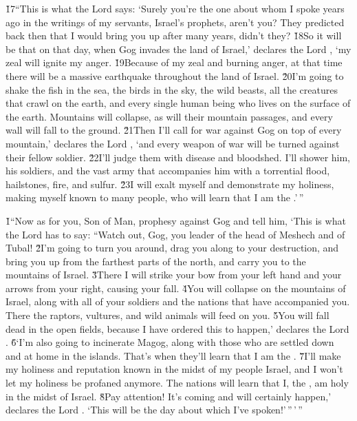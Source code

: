 \v{17}``This is what the Lord  says: `Surely you're the one about whom I spoke years ago in the writings of my servants, Israel's prophets, aren't you? They predicted back then that I would bring you up after many years, didn't they? \v{18}So it will be that on that day, when Gog invades the land of Israel,' declares the Lord , `my zeal will ignite my anger. \v{19}Because of my zeal and burning anger, at that time there will be a massive earthquake throughout the land of Israel. \v{20}I'm going to shake the fish in the sea, the birds in the sky, the wild beasts, all the creatures that crawl on the earth, and every single human being who lives on the surface of the earth. Mountains will collapse, as will their mountain passages, and every wall will fall to the ground. \v{21}Then I'll call for war against Gog on top of every mountain,' declares the Lord , `and every weapon of war will be turned against their fellow soldier. \v{22}I'll judge them with disease and bloodshed. I'll shower him, his soldiers, and the vast army that accompanies him with a torrential flood, hailstones, fire, and sulfur. \v{23}I will exalt myself and demonstrate my holiness, making myself known to many people, who will learn that I am the .'\,''

\v{1}``Now as for you, Son of Man, prophesy against Gog and tell him, `This is what the Lord  has to say: ``Watch out, Gog, you leader of the head of Meshech and of Tubal! \v{2}I'm going to turn you around, drag you along to your destruction, and bring you up from the farthest parts of the north, and carry you to the mountains of Israel. \v{3}There I will strike your bow from your left hand and your arrows from your right, causing your fall. \v{4}You will collapse on the mountains of Israel, along with all of your soldiers and the nations that have accompanied you. There the raptors, vultures, and wild animals will feed on you. \v{5}You will fall dead in the open fields, because I have ordered this to happen,' declares the Lord . \v{6}`I'm also going to incinerate Magog, along with those who are settled down and at home in the islands. That's when they'll learn that I am the . \v{7}I'll make my holiness and reputation known in the midst of my people Israel, and I won't let my holiness be profaned anymore. The nations will learn that I, the , am holy in the midst of Israel. \v{8}Pay attention! It's coming and will certainly happen,' declares the Lord . `This will be the day about which I've spoken!'\,''\,'\,''

